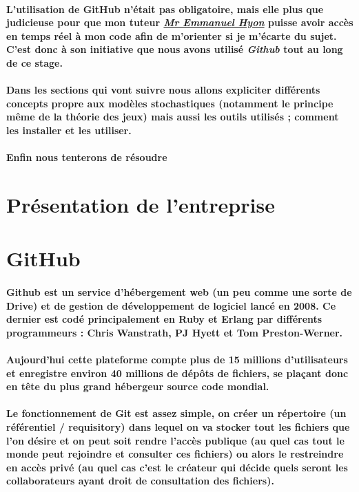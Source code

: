 \documentclass[a4paper, 12pt, twoside]{article}
\begin{document}
\paragraph{L'utilisation de GitHub n'était pas obligatoire, mais elle plus que judicieuse pour que mon tuteur \underline{\textit{Mr Emmanuel Hyon}} puisse avoir accès en temps réel à mon code afin de m'orienter si je m'écarte du sujet. C'est donc à son initiative que nous avons utilisé \textit{Github} tout au long de ce stage.}
\paragraph{Dans les sections qui vont suivre nous allons expliciter différents concepts propre aux modèles stochastiques (notamment le principe même de la théorie des jeux) mais aussi les outils utilisés ; comment les installer et les utiliser. }
\paragraph{Enfin nous tenterons de résoudre }



\section{Présentation de l'entreprise}


\section{GitHub}
\paragraph{Github est un service d'hébergement web (un peu comme une sorte de Drive) et de gestion de développement de logiciel lancé en 2008.
Ce dernier est codé principalement en Ruby et Erlang par différents programmeurs : Chris Wanstrath, PJ Hyett et Tom Preston-Werner.}

\paragraph{Aujourd'hui cette plateforme compte plus de 15 millions d'utilisateurs et enregistre environ 40 millions de dépôts de fichiers,
se plaçant donc en tête du plus grand hébergeur source code mondial.}

\paragraph{Le fonctionnement de Git est assez simple, on créer un répertoire (un référentiel / requisitory) dans lequel on va stocker tout les fichiers que l'on désire et on peut soit rendre l'accès publique (au quel cas tout le monde peut rejoindre et consulter ces fichiers) ou alors le  restreindre en accès privé (au quel cas c'est le créateur qui décide quels seront les collaborateurs ayant droit de consultation des fichiers).}
\end{document}
